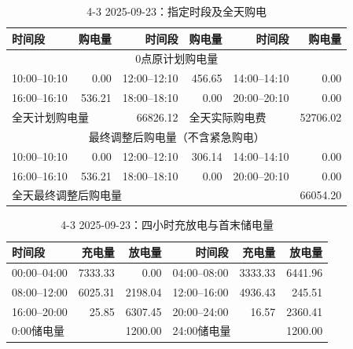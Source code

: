 \FloatBarrier
\begin{table}[htbp]\centering\scriptsize
\caption{4-3 2025-09-23：指定时段及全天购电}
\begin{tabular}{lrrrrr}\toprule
时间段 & 购电量 & 时间段 & 购电量 & 时间段 & 购电量\\\midrule
\multicolumn{6}{c}{0点原计划购电量}\\
10:00--10:10 & 0.00 & 12:00--12:10 & 456.65 & 14:00--14:10 & 0.00\\
16:00--16:10 & 536.21 & 18:00--18:10 & 0.00 & 20:00--20:10 & 0.00\\
\multicolumn{2}{l}{全天计划购电量} & 66826.12 & \multicolumn{2}{l}{全天实际购电费} & 52706.02\\
\multicolumn{6}{c}{最终调整后购电量（不含紧急购电）}\\
10:00--10:10 & 0.00 & 12:00--12:10 & 306.14 & 14:00--14:10 & 0.00\\
16:00--16:10 & 536.21 & 18:00--18:10 & 0.00 & 20:00--20:10 & 0.00\\
\multicolumn{5}{l}{全天最终调整后购电量} & 66054.20\\
\bottomrule\end{tabular}\end{table}

\begin{table}[htbp]\centering\scriptsize
\caption{4-3 2025-09-23：四小时充放电与首末储电量}
\begin{tabular}{lrrrrr}\toprule
时间段 & 充电量 & 放电量 & 时间段 & 充电量 & 放电量\\\midrule
00:00--04:00 & 7333.33 & 0.00 & 04:00--08:00 & 3333.33 & 6441.96\\
08:00--12:00 & 6025.31 & 2198.04 & 12:00--16:00 & 4936.43 & 245.51\\
16:00--20:00 & 25.85 & 6307.45 & 20:00--24:00 & 16.57 & 2360.41\\
\multicolumn{2}{l}{0:00储电量} & 1200.00 & \multicolumn{2}{l}{24:00储电量} & 1200.00\\
\bottomrule\end{tabular}\end{table}

